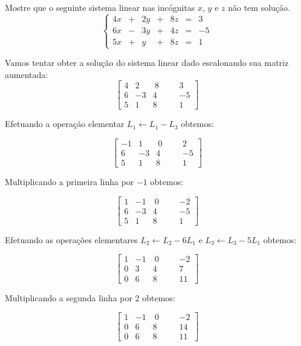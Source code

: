 \begin{problem}
Mostre que o seguinte sistema linear nas incógnitas $x$, $y$ e $z$ não tem solução.
$$\left\{\begin{array}{rrrrrrr}
 4x & + & 2y & + & 8z & = &  3 \\
 6x & - & 3y & + & 4z & = & -5 \\
 5x & + &  y & + & 8z & = &  1 \end{array}\right. $$
\end{problem}
\begin{solution}
Vamos tentar obter a solução do sistema linear dado escalonando sua matriz aumentada:
$$ \left[\begin{array}{rrrr|rr}
	4 &   2 & \  8 & & &   3  \\
	6 &  -3 &    4 & & &  -5  \\ 
	5 &   1 &    8 & & &   1  \end{array}\right] $$

Efetuando a operação elementar $L_1 \leftarrow L_1 - L_3$ obtemos:

$$ \left[\begin{array}{rrrr|rr}
 -1 &   1 & \  0 & & &   2  \\
	6 &  -3 &    4 & & &  -5  \\ 
	5 &   1 &    8 & & &   1  \end{array}\right] $$

Multiplicando a primeira linha por $-1$ obtemos:

$$ \left[\begin{array}{rrrr|rr}
	1 &  -1 & \  0 & & &  -2  \\
	6 &  -3 &    4 & & &  -5  \\ 
	5 &   1 &    8 & & &   1  \end{array}\right] $$

Efetuando as operações elementares $L_2 \leftarrow L_2 - 6L_1$ e $L_3 \leftarrow L_3 - 5L_1$ obtemos:

$$ \left[\begin{array}{rrrr|rr}
	1 &  -1 & \  0 & & &  -2  \\
	0 &   3 &    4 & & &   7  \\
	0 &   6 &    8 & & &  11  \end{array}\right] $$

Multiplicando a segunda linha por 2 obtemos:

$$ \left[\begin{array}{rrrr|rr}
	1 &  -1 & \  0 & & &  -2  \\
	0 &   6 &    8 & & &  14  \\
	0 &   6 &    8 & & &  11  \end{array}\right] $$


\end{solution}
